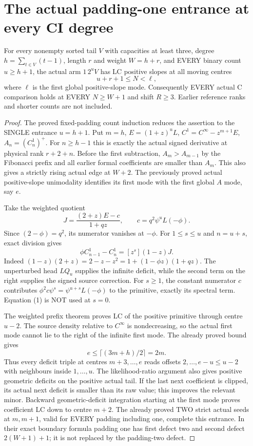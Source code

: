 \section{The actual padding-one entrance at every CI degree}
For every nonempty sorted tail $V$ with capacities at least three,
degree $h=\sum_{t\in V}(t-1)$, length $r$ and weight $W=h+r$,
and EVERY binary count $u\ge h+1$, the actual arm $1\,2^uV$
has LC positive slopes at all moving centres
\[
                     u+r+1\le N<\ell,
\]
where $\ell$ is the first global positive-slope mode. Consequently
EVERY actual C comparison holds at EVERY $N\ge W+1$ and shift
$R\ge3$. Earlier reference ranks and shorter counts are not included.

\begin{proof}
The proved fixed-padding count induction reduces the assertion to
the SINGLE entrance $u=h+1$. Put $m=h$,
$E=(1+z)^uL$, $C^1=C^\infty-z^{m+1}E$, $A_n=(C^1_n)^+$.
For $n\ge h-1$ this is exactly the actual signed derivative at
physical rank $r+2+n$. Before the first subtraction, $A_m>A_{m-1}$
by the Fibonacci prefix and all earlier formal coefficients are
smaller than $A_m$. This also gives a strictly rising actual edge
at $W+2$. The previously proved actual positive-slope unimodality
identifies its first mode with the first global $A$ mode, say $e$.

Take the weighted quotient
\[
 J=\frac{(2+z)E-c}{1+qz},\qquad
                 c=q^2\psi^uL(-\phi).
\]
Since $(2-\phi)=q^2$, its numerator vanishes at $-\phi$.
For $1\le s\le u$ and $n=u+s$, exact division gives
\[
              \phi C^1_{n-1}-C^1_n=[z^s](1-z)J.       \tag{1}
\]
Indeed $(1-z)(2+z)=2-z-z^2=1+(1-\phi z)(1+qz)$.
The unperturbed head $LQ_u$ supplies the infinite deficit, while
the second term on the right supplies the signed source correction.
For $s\ge1$, the constant numerator $c$ contributes
$\phi^2c\psi^s=\psi^{u+s}L(-\phi)$ to the primitive, exactly its
spectral term. Equation (1) is NOT used at $s=0$.

The weighted prefix theorem proves LC of the positive primitive
through centre $u-2$. The source density relative to $C^\infty$
is nondecreasing, so the actual first mode cannot lie to the right
of the infinite first mode. The already proved bound gives
\[
                  e\le\lceil(3m+h)/2\rceil=2m.
\]
Thus every deficit triple at centres $m+3,\ldots,e$ reads offsets
$2,\ldots,e-u\le u-2$ with neighbours inside $1,\ldots,u$.
The likelihood-ratio argument also gives positive geometric deficits
on the positive actual tail. If the last next coefficient is clipped,
its actual next deficit is smaller than its raw value; this improves
the relevant minor. Backward geometric-deficit integration starting
at the first mode proves coefficient LC down to centre $m+2$.
The already proved TWO strict actual seeds at $m,m+1$, valid for
EVERY padding including one, complete this entrance. In their exact
boundary formula padding one has first defect two and second defect
$2(W+1)+1$; it is not replaced by the padding-two defect.


\end{proof}
